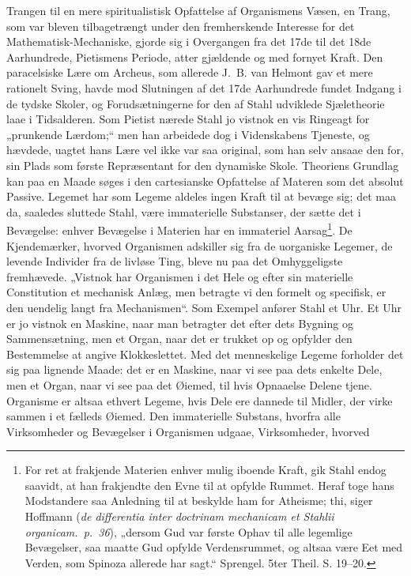 \documentclass[12pt,a4paper]{book}
\begin{document}
Trangen til en mere spiritualistisk Opfattelse af Organismens
Væsen, en Trang, som var bleven tilbagetrængt under den
fremherskende Interesse for det Mathematisk-Mechaniske, gjorde sig i
Overgangen fra det 17de til det 18de Aarhundrede, Pietismens
Periode, atter gjældende og med fornyet Kraft. Den paracelsiske
Lære om Archeus, som allerede J.~B. van Helmont gav et mere
rationelt Sving, havde mod Slutningen af det 17de Aarhundrede
fundet Indgang i de tydske Skoler, og Forudsætningerne for den af
Stahl udviklede Sjæletheorie laae i Tidsalderen. Som Pietist nærede
Stahl jo vistnok en vis Ringeagt for „prunkende Lærdom;“ men han
arbeidede dog i Videnskabens Tjeneste, og hævdede, uagtet hans Lære
vel ikke var saa original, som han selv ansaae den for, sin Plads
som første Repræsentant for den dynamiske Skole. Theoriens
Grundlag kan paa en Maade søges i den cartesianske Opfattelse af
Materen som det absolut Passive. Legemet har som Legeme aldeles
ingen Kraft til at bevæge sig; det maa da, saaledes sluttede Stahl,
være immaterielle Substanser, der sætte det i Bevægelse: enhver
Bevægelse i Materien har en immateriel
Aarsag\footnote{For ret at frakjende Materien enhver mulig iboende
Kraft, gik Stahl endog saavidt, at han frakjendte den Evne til at
opfylde Rummet. Heraf toge hans Modstandere saa Anledning til at
beskylde ham for Atheisme; thi, siger Hoffmann (\textit{de
differentia inter doctrinam mechanicam et Stahlii organicam.\ p.\
36}), „dersom Gud var første Ophav til alle legemlige Bevægelser, saa
maatte Gud opfylde Verdensrummet, og altsaa være Eet med Verden, som
Spinoza allerede har sagt.“ Sprengel. 5ter Theil. S. 19--20.}. De
Kjendemærker, hvorved Organismen adskiller sig fra de uorganiske
Legemer, de levende Individer fra de livløse Ting, bleve nu paa det
Omhyggeligste fremhævede. „Vistnok har
\setcounter{footnote}{0}
Organismen i det Hele og efter sin materielle Constitution et
mechanisk Anlæg, men betragte vi den formelt og specifisk, er den
uendelig langt fra Mechanismen“. Som Exempel anfører Stahl et Uhr.
Et Uhr er jo vistnok en Maskine, naar man betragter det efter dets
Bygning og Sammensætning, men et Organ, naar det er trukket op og
opfylder den Bestemmelse at angive Klokkeslettet. Med det
menneskelige Legeme forholder det sig paa lignende Maade: det er en
Maskine, naar vi see paa dets enkelte Dele, men et Organ, naar vi see
paa det Øiemed, til hvis Opnaaelse Delene tjene. Organisme er altsaa
ethvert Legeme, hvis Dele ere dannede til Midler, der virke sammen i
et fælleds Øiemed. Den immaterielle Substans, hvorfra alle
Virksomheder og Bevægelser i Organismen udgaae, Virksomheder, hvorved
\end{document}
